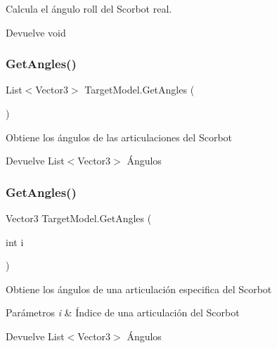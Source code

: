 Calcula el ángulo roll del Scorbot real. \begin{DoxyReturn}{Devuelve}
void 
\end{DoxyReturn}
\mbox{\label{class_target_model_a6e50c4236edc8efc587238ccfdf90c7e}} 
\subsubsection{\texorpdfstring{GetAngles()}{GetAngles()}\hspace{0.1cm}{\footnotesize\ttfamily [1/2]}}
{\footnotesize\ttfamily List$<$Vector3$>$ Target\+Model.\+Get\+Angles (\begin{DoxyParamCaption}{ }\end{DoxyParamCaption})\hspace{0.3cm}{\ttfamily [inline]}}

Obtiene los ángulos de las articulaciones del Scorbot \begin{DoxyReturn}{Devuelve}
List$<$\+Vector3$>$ Ángulos 
\end{DoxyReturn}
\mbox{\label{class_target_model_a8234e7f5a9811ba3b72ec74de2a38926}} 
\subsubsection{\texorpdfstring{GetAngles()}{GetAngles()}\hspace{0.1cm}{\footnotesize\ttfamily [2/2]}}
{\footnotesize\ttfamily Vector3 Target\+Model.\+Get\+Angles (\begin{DoxyParamCaption}\item[{int}]{i }\end{DoxyParamCaption})\hspace{0.3cm}{\ttfamily [inline]}}

Obtiene los ángulos de una articulación especifica del Scorbot 
\begin{DoxyParams}{Parámetros}
{\em i} & Índice de una articulación del Scorbot \\
\hline
\end{DoxyParams}
\begin{DoxyReturn}{Devuelve}
List$<$\+Vector3$>$ Ángulos 
\end{DoxyReturn}
\mbox{\label{class_target_model_a3f08aa61678b55ad41acc59c9d4f4f9c}} 
